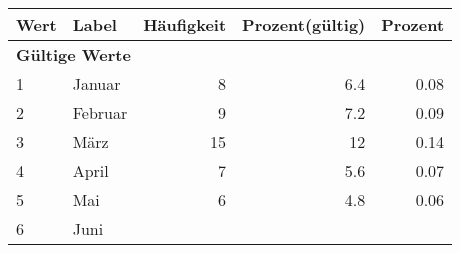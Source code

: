      \begin{longtable}{lXrrr}
     \toprule
     \textbf{Wert} & \textbf{Label} & \textbf{Häufigkeit} & \textbf{Prozent(gültig)} & \textbf{Prozent} \\
     \endhead
     \midrule
     \multicolumn{5}{l}{\textbf{Gültige Werte}}\\

     1 &
     \multicolumn{1}{X}{ Januar   } &


       \num{8} &
       \num[round-mode=places,round-precision=2]{6.4} &
         \num[round-mode=places,round-precision=2]{0.08} \\

     2 &
     \multicolumn{1}{X}{ Februar   } &


       \num{9} &
       \num[round-mode=places,round-precision=2]{7.2} &
         \num[round-mode=places,round-precision=2]{0.09} \\

     3 &
     \multicolumn{1}{X}{ März   } &


       \num{15} &
       \num[round-mode=places,round-precision=2]{12} &
         \num[round-mode=places,round-precision=2]{0.14} \\

     4 &
     \multicolumn{1}{X}{ April   } &


       \num{7} &
       \num[round-mode=places,round-precision=2]{5.6} &
         \num[round-mode=places,round-precision=2]{0.07} \\

     5 &
     \multicolumn{1}{X}{ Mai   } &


       \num{6} &
       \num[round-mode=places,round-precision=2]{4.8} &
         \num[round-mode=places,round-precision=2]{0.06} \\

     6 &
     \multicolumn{1}{X}{ Juni   } &



\end{longtable}
